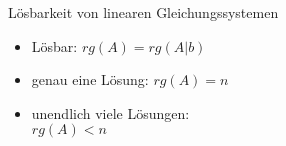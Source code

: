     

    \begin{theorem}{Lösbarkeit von linearen Gleichungssystemen}

        \begin{minipage}{0.5\linewidth}
            \begin{itemize}
                \item Lösbar: $rg(A) = rg(A|b)$
                \item genau eine Lösung: $rg(A) = n$
            \end{itemize}
        \end{minipage}
        \begin{minipage}{0.5\linewidth}
            \begin{itemize}
                \item unendlich viele Lösungen:\\ $rg(A) < n$
            \end{itemize}
        \end{minipage}
    \end{theorem}

